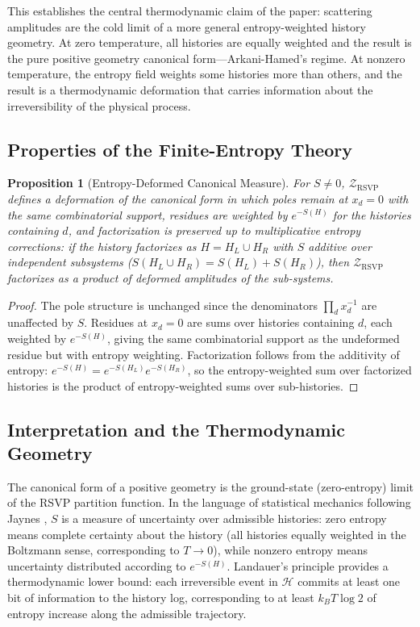 \documentclass[12pt, oneside]{amsart}
\theoremstyle{plain}
\newtheorem{proposition}[theorem]{Proposition}
\theoremstyle{definition}
\theoremstyle{remark}
\newcommand{\Sf}{S}
\newcommand{\HKS}{\mathcal{H}}
\newcommand{\ZRSVP}{\mathcal{Z}_{\mathrm{RSVP}}}
\begin{document}
This establishes the central thermodynamic claim of the paper: scattering amplitudes are the cold limit of a more general entropy-weighted history geometry. At zero temperature, all histories are equally weighted and the result is the pure positive geometry canonical form---Arkani-Hamed's regime. At nonzero temperature, the entropy field weights some histories more than others, and the result is a thermodynamic deformation that carries information about the irreversibility of the physical process.

\subsection{Properties of the Finite-Entropy Theory}

\begin{proposition}[Entropy-Deformed Canonical Measure]
For $\Sf \neq 0$, $\ZRSVP$ defines a deformation of the canonical form in which poles remain at $x_d = 0$ with the same combinatorial support, residues are weighted by $e^{-\Sf(H)}$ for the histories containing $d$, and factorization is preserved up to multiplicative entropy corrections: if the history factorizes as $H = H_L \cup H_R$ with $\Sf$ additive over independent subsystems ($\Sf(H_L \cup H_R) = \Sf(H_L) + \Sf(H_R)$), then $\ZRSVP$ factorizes as a product of deformed amplitudes of the sub-systems.
\end{proposition}

\begin{proof}
The pole structure is unchanged since the denominators $\prod_d x_d^{-1}$ are unaffected by $\Sf$. Residues at $x_d = 0$ are sums over histories containing $d$, each weighted by $e^{-\Sf(H)}$, giving the same combinatorial support as the undeformed residue but with entropy weighting. Factorization follows from the additivity of entropy: $e^{-\Sf(H)} = e^{-\Sf(H_L)} e^{-\Sf(H_R)}$, so the entropy-weighted sum over factorized histories is the product of entropy-weighted sums over sub-histories.
\end{proof}

\subsection{Interpretation and the Thermodynamic Geometry}

The canonical form of a positive geometry is the ground-state (zero-entropy) limit of the RSVP partition function. In the language of statistical mechanics following Jaynes \cite{Jaynes1957}, $\Sf$ is a measure of uncertainty over admissible histories: zero entropy means complete certainty about the history (all histories equally weighted in the Boltzmann sense, corresponding to $T \to 0$), while nonzero entropy means uncertainty distributed according to $e^{-\Sf(H)}$. Landauer's principle \cite{Landauer1961} provides a thermodynamic lower bound: each irreversible event in $\HKS$ commits at least one bit of information to the history log, corresponding to at least $k_B T \log 2$ of entropy increase along the admissible trajectory.
\end{document}

